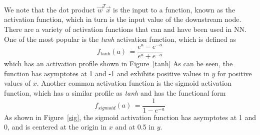\documentclass[letterpaper,12pt]{article}
\newcommand{\figref}[1]{Figure~\ref{#1}}
\begin{document}
We note that the dot product $\vec{w}^T\vec{x}$ is the input to a function, known as the activation function, which in turn is the input value of the downstream node. There are a variety of activation functions that can and have been used in NN. One of the most popular is the \textit{tanh} activation function, which is defined as
\begin{equation}
f_{\text{tanh}}(a) \, = \frac{e^a-e^{-a}}{e^a+e^{-a}}
\end{equation}
which has an activation profile shown in \figref{tanh} As can be seen, the function has asymptotes  at 1 and -1 and exhibits positive values in $y$ for positive values of $x$. Another common activation function is the sigmoid activation function, which has a similar profile as \textit{tanh} and has the functional form
\begin{equation}
f_{sigmoid}(a) \, = \frac{1}{1-e^{-a}}
\end{equation}
As shown in \figref{sig}, the sigmoid activation function has asymptotes at 1 and 0, and is centered at the origin in $x$ and at 0.5 in $y$. 
\end{document}
